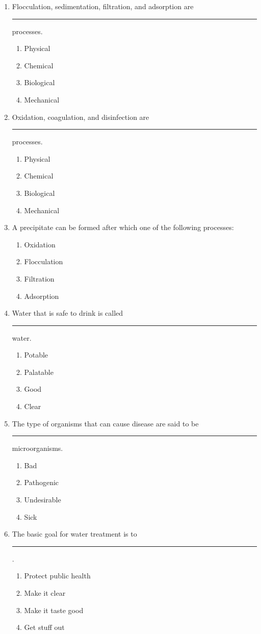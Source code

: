 \documentclass[10pt]{article}
\begin{document}
\begin{enumerate}
\begin{enumerate}
\item Flocculation, sedimentation, filtration, and adsorption are \rule{2cm}{0.3pt}
processes.
\begin{enumerate}
\item Physical
\item Chemical
\item Biological
\item Mechanical
\end{enumerate}

\item Oxidation, coagulation, and disinfection are \rule{2cm}{0.3pt} processes.
\begin{enumerate}
\item Physical
\item Chemical
\item Biological
\item Mechanical
\end{enumerate}

\item A precipitate can be formed after which one of the following processes:
\begin{enumerate}
\item Oxidation
\item Flocculation
\item Filtration
\item Adsorption
\end{enumerate}

\item Water that is safe to drink is called \rule{1cm}{0.5pt}  water.
\begin{enumerate}
\item Potable
\item Palatable
\item Good
\item Clear
\end{enumerate}

\item The type of organisms that can cause disease are said to be \rule{1cm}{0.5pt} microorganisms.
\begin{enumerate}
\item Bad
\item Pathogenic
\item Undesirable
\item Sick
\end{enumerate}

\item The basic goal for water treatment is to \rule{1cm}{0.5pt}.
\begin{enumerate}
\item Protect public health
\item Make it clear
\item Make it taste good
\item Get stuff out
\end{enumerate}


\end{enumerate}
\end{enumerate}
\end{document}
